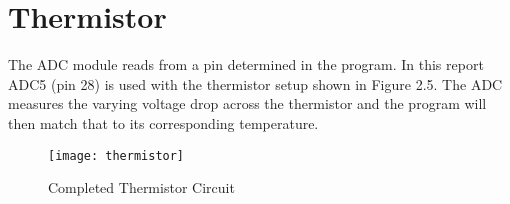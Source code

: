 \documentclass[main.tex]{subfiles}
\begin{document}
	\section{Thermistor}
	The ADC module reads from a pin determined in the program. In this report ADC5 (pin 28) is used
	with the thermistor setup shown in Figure 2.5. The ADC measures the varying voltage drop
	across the thermistor and the program will then match that to its corresponding temperature.
	\begin{figure}[H]
		\begin{center}
			\texttt{[image: thermistor]}
		\end{center}
		\caption{Completed Thermistor Circuit}
		\label{fig:therm}
	\end{figure}
\end{document}
